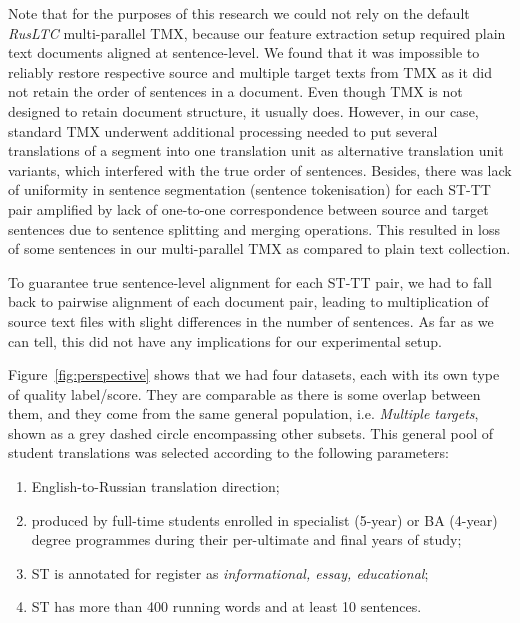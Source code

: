 Note that for the purposes of this research we could not rely on the default \textit{RusLTC} multi-parallel TMX, because our feature extraction setup required plain text documents aligned at sentence-level. We found that it was impossible to reliably restore respective source and multiple target texts from TMX as it did not retain the order of sentences in a document. Even though TMX is not designed to retain document structure, it usually does. However, in our case, standard TMX underwent additional processing needed to put several translations of a segment into one translation unit as alternative translation unit variants, which interfered with the true order of sentences. Besides, there was lack of uniformity in sentence segmentation (sentence tokenisation) for each ST-TT pair amplified by lack of one-to-one correspondence between source and target sentences due to sentence splitting and merging operations. This resulted in loss of some sentences in our multi-parallel TMX as compared to plain text collection.

To guarantee true sentence-level alignment for each ST-TT pair, we had to fall back to pairwise alignment of each document pair, leading to multiplication of source text files with slight differences in the number of sentences. As far as we can tell, this did not have any implications for our experimental setup.

Figure~\ref{fig:perspective} shows that we had four datasets, each with its own type of quality label/score.
They are comparable as there is some overlap between them, and they come from the same general population, i.e. \textit{Multiple targets}, shown as a grey dashed circle encompassing other subsets. This general pool of student translations was selected according to the following parameters:
\begin{enumerate}\compresslist{}
	\item English-to-Russian translation direction;
	\item produced by full-time students enrolled in specialist (5-year) or BA (4-year) degree programmes during their per-ultimate and final years of study;
    \item ST is annotated for register as \textit{informational, essay, educational};
    \item ST has more than 400 running words and at least 10 sentences.
\end{enumerate}


